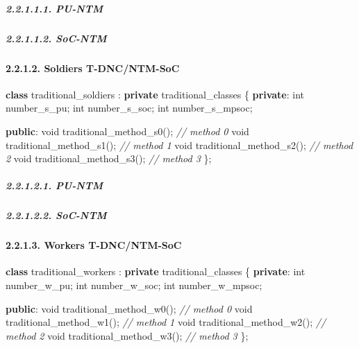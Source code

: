 \documentclass[]{article}
\newenvironment{Shaded}{}{}
\newcommand{\KeywordTok}[1]{\textcolor[rgb]{0.00,0.44,0.13}{\textbf{#1}}}
\newcommand{\DataTypeTok}[1]{\textcolor[rgb]{0.56,0.13,0.00}{#1}}
\newcommand{\CommentTok}[1]{\textcolor[rgb]{0.38,0.63,0.69}{\textit{#1}}}
\newcommand{\NormalTok}[1]{#1}
\let\oldparagraph\paragraph
\renewcommand{\paragraph}[1]{\oldparagraph{#1}\mbox{}}
\let\oldsubparagraph\subparagraph
\renewcommand{\subparagraph}[1]{\oldsubparagraph{#1}\mbox{}}
\begin{document}
\subparagraph{2.2.1.1.1. PU-NTM}\label{pu-ntm}

\subparagraph{2.2.1.1.2. SoC-NTM}\label{soc-ntm}

\paragraph{2.2.1.2. Soldiers T-DNC/NTM-SoC}\label{soldiers-t-dncntm-soc}

\begin{Shaded}
\begin{Highlighting}[]
\KeywordTok{class}\NormalTok{ traditional_soldiers : }\KeywordTok{private}\NormalTok{ traditional_classes \{}
   \KeywordTok{private}\NormalTok{:}
      \DataTypeTok{int}\NormalTok{ number_s_pu;}
      \DataTypeTok{int}\NormalTok{ number_s_soc;}
      \DataTypeTok{int}\NormalTok{ number_s_mpsoc;}

   \KeywordTok{public}\NormalTok{:}
      \DataTypeTok{void}\NormalTok{ traditional_method_s0();  }\CommentTok{// method 0}
      \DataTypeTok{void}\NormalTok{ traditional_method_s1();  }\CommentTok{// method 1}
      \DataTypeTok{void}\NormalTok{ traditional_method_s2();  }\CommentTok{// method 2}
      \DataTypeTok{void}\NormalTok{ traditional_method_s3();  }\CommentTok{// method 3}
\NormalTok{\};}
\end{Highlighting}
\end{Shaded}

\subparagraph{2.2.1.2.1. PU-NTM}\label{pu-ntm-1}

\subparagraph{2.2.1.2.2. SoC-NTM}\label{soc-ntm-1}

\paragraph{2.2.1.3. Workers T-DNC/NTM-SoC}\label{workers-t-dncntm-soc}

\begin{Shaded}
\begin{Highlighting}[]
\KeywordTok{class}\NormalTok{ traditional_workers : }\KeywordTok{private}\NormalTok{ traditional_classes \{}
   \KeywordTok{private}\NormalTok{:}
      \DataTypeTok{int}\NormalTok{ number_w_pu;}
      \DataTypeTok{int}\NormalTok{ number_w_soc;}
      \DataTypeTok{int}\NormalTok{ number_w_mpsoc;}

   \KeywordTok{public}\NormalTok{:}
      \DataTypeTok{void}\NormalTok{ traditional_method_w0();  }\CommentTok{// method 0}
      \DataTypeTok{void}\NormalTok{ traditional_method_w1();  }\CommentTok{// method 1}
      \DataTypeTok{void}\NormalTok{ traditional_method_w2();  }\CommentTok{// method 2}
      \DataTypeTok{void}\NormalTok{ traditional_method_w3();  }\CommentTok{// method 3}
\NormalTok{\};}
\end{Highlighting}
\end{Shaded}
\end{document}

